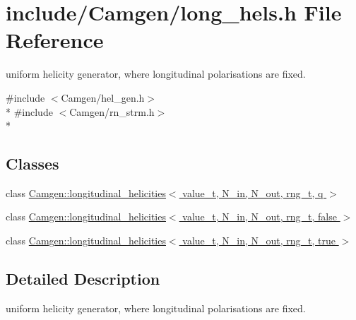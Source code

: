 \hypertarget{a00682}{}\section{include/\+Camgen/long\+\_\+hels.h File Reference}
\label{a00682}


uniform helicity generator, where longitudinal polarisations are fixed.  


{\ttfamily \#include $<$Camgen/hel\+\_\+gen.\+h$>$}\\*
{\ttfamily \#include $<$Camgen/rn\+\_\+strm.\+h$>$}\\*
\subsection*{Classes}
\begin{DoxyCompactItemize}
\item 
class \hyperlink{a00331}{Camgen\+::longitudinal\+\_\+helicities$<$ value\+\_\+t, N\+\_\+in, N\+\_\+out, rng\+\_\+t, q $>$}
\item 
class \hyperlink{a00332}{Camgen\+::longitudinal\+\_\+helicities$<$ value\+\_\+t, N\+\_\+in, N\+\_\+out, rng\+\_\+t, false $>$}
\item 
class \hyperlink{a00333}{Camgen\+::longitudinal\+\_\+helicities$<$ value\+\_\+t, N\+\_\+in, N\+\_\+out, rng\+\_\+t, true $>$}
\end{DoxyCompactItemize}


\subsection{Detailed Description}
uniform helicity generator, where longitudinal polarisations are fixed. 


